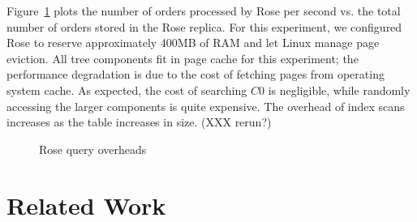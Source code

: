 \documentclass{vldb}
\newcommand{\rows}{Rose\xspace}
\newcommand{\rowss}{Rose's\xspace}
\begin{document}
Figure~\ref{fig:tpch} plots the number of orders processed by \rows
per second vs. the total number of orders stored in the \rows replica.
For this experiment, we configured \rows to reserve approximately
400MB of RAM and let Linux manage page eviction.  All tree components
fit in page cache for this experiment; the performance degradation is
due to the cost of fetching pages from operating system cache.
As expected, the cost of searching $C0$ is negligible,
while randomly accessing the larger components is quite expensive.
The overhead of index scans increases as the table increases in size. (XXX rerun?)

\begin{figure}
\centering {}
\caption{\rows query overheads}
\label{fig:tpch}
\end{figure}




\section{Related Work}
\end{document}
